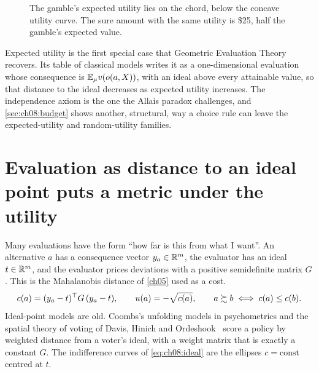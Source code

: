 \begin{figure}[tbp]
\centering
{}
\caption{The gamble's expected utility lies on the chord, below the concave utility curve. The sure amount with the same utility is \$25, half the gamble's expected value.}
\label{fig:ch08:eu}
\end{figure}

Expected utility is the first special case that Geometric Evaluation Theory recovers. Its table of classical models writes it as a one-dimensional evaluation whose consequence is $\mathbb{E}_\mu v(o(a,X))$, with an ideal above every attainable value, so that distance to the ideal decreases as expected utility increases. The independence axiom is the one the Allais paradox challenges, and \cref{sec:ch08:budget} shows another, structural, way a choice rule can leave the expected-utility and random-utility families.


\section{Evaluation as distance to an ideal point puts a metric under the utility}\label{sec:ch08:ideal}

Many evaluations have the form ``how far is this from what I want''. An alternative $a$ has a consequence vector $y_a\in\mathbb{R}^m$, the evaluator has an ideal $t\in\mathbb{R}^m$, and the evaluator prices deviations with a positive semidefinite matrix $G$. This is the Mahalanobis distance of \cref{ch05} used as a cost.
\begin{equation}\label{eq:ch08:ideal}
c(a)=(y_a-t)^{\top} G\,(y_a-t),\qquad u(a)=-\sqrt{c(a)},\qquad a\succsim b\iff c(a)\le c(b).
\end{equation}
Ideal-point models are old. Coombs's unfolding models in psychometrics and the spatial theory of voting of Davis, Hinich and Ordeshook~\cite{davis1970} score a policy by weighted distance from a voter's ideal, with a weight matrix that is exactly a constant $G$. The indifference curves of \eqref{eq:ch08:ideal} are the ellipses $c=\text{const}$ centred at $t$.

